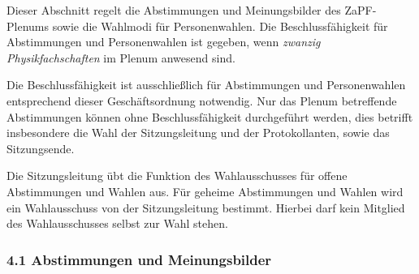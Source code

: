 Dieser Abschnitt regelt die Abstimmungen und Meinungsbilder des ZaPF-Plenums
sowie die Wahlmodi für Personenwahlen. Die Beschlussfähigkeit für Abstimmungen
und Personenwahlen ist gegeben, wenn \emph{zwanzig Physikfachschaften}
im Plenum anwesend sind.

Die Beschlussfähigkeit ist ausschließlich für Abstimmungen und Personenwahlen
entsprechend dieser Geschäftsordnung notwendig.
Nur das Plenum betreffende Abstimmungen können ohne Beschlussfähigkeit
durchgeführt werden, dies betrifft insbesondere die Wahl der Sitzungsleitung und der
Protokollanten, sowie das Sitzungsende.

Die Sitzungsleitung übt die Funktion des Wahlausschusses für offene Abstimmungen und
Wahlen aus. Für geheime Abstimmungen und Wahlen wird ein Wahlausschuss von der
Sitzungsleitung bestimmt. Hierbei darf kein Mitglied des Wahlausschusses selbst zur
Wahl stehen.


\subsubsection*{4.1 Abstimmungen und Meinungsbilder%
  \label{abstimmungen-und-meinungsbilder}%
}

